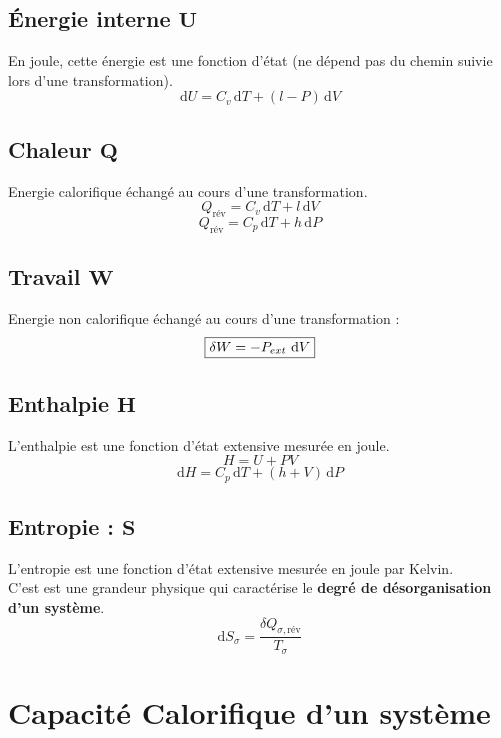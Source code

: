 \documentclass[a4paper,12pt]{article}
\newcommand{\diff}{\mathrm{d}} %
\newcommand{\re}{\textrm}
\begin{document}
\begin{multicols}{2}
    \subsection*{Énergie interne $\bm{U}$}
        En joule, cette énergie est une fonction d'état (ne dépend pas du chemin suivie lors d'une transformation).
        $$ \boxed{ \diff U = C_v \, \diff T + (l - P) \, \diff V } $$

    \subsection*{Chaleur $\bm{Q}$}
        Energie calorifique échangé au cours d'une transformation.
            $$ \boxed{ Q_{\text{rév}} = C_v \, \diff T + l \, \diff V } $$
            $$ \boxed{ Q_{\text{rév}} = C_p \, \diff T + h \, \diff P } $$

    \subsection*{Travail $\bm{W}$}
        Energie non calorifique échangé au cours d'une transformation :
            $$ \boxed{\delta W = - P_{ext}\ \re d V} $$

    \subsection*{Enthalpie $\bm{H}$}
        L'enthalpie est une fonction d'état extensive mesurée en joule.
            $$ \boxed{H = U + P V} $$
            $$ \boxed{ \diff H = C_p \, \diff T + (h + V) \, \diff P } $$

    \subsection*{Entropie : $\bm{S}$}
        L'entropie est une fonction d'état extensive mesurée en joule par Kelvin.\\
        C'est est une grandeur physique qui caractérise le \textbf{degré de désorganisation d'un système}.
        $$ \boxed{\diff S_\sigma = \frac{\delta Q_{\sigma,\text{rév}}}{T_\sigma}} $$

    \end{multicols}

\clearpage

\section{Capacité Calorifique d'un système}
\end{document}
